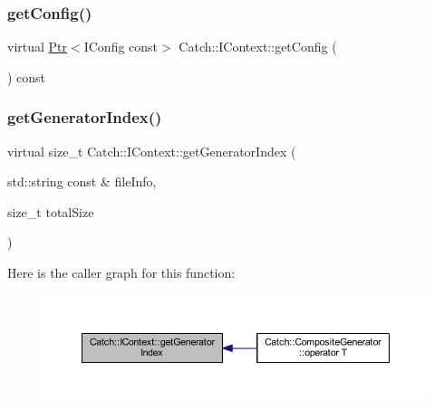 \subsubsection{\texorpdfstring{get\+Config()}{getConfig()}}
{\footnotesize\ttfamily virtual \hyperlink{class_catch_1_1_ptr}{Ptr}$<$I\+Config const$>$ Catch\+::\+I\+Context\+::get\+Config (\begin{DoxyParamCaption}{ }\end{DoxyParamCaption}) const\hspace{0.3cm}{\ttfamily [pure virtual]}}

\hypertarget{struct_catch_1_1_i_context_a43e07088db43299ba129fbe6d3106e95}{}\label{struct_catch_1_1_i_context_a43e07088db43299ba129fbe6d3106e95} 
\subsubsection{\texorpdfstring{get\+Generator\+Index()}{getGeneratorIndex()}}
{\footnotesize\ttfamily virtual size\+\_\+t Catch\+::\+I\+Context\+::get\+Generator\+Index (\begin{DoxyParamCaption}\item[{std\+::string const \&}]{file\+Info,  }\item[{size\+\_\+t}]{total\+Size }\end{DoxyParamCaption})\hspace{0.3cm}{\ttfamily [pure virtual]}}

Here is the caller graph for this function\+:\nopagebreak
\begin{figure}[H]
\begin{center}
\leavevmode
\includegraphics[width=350pt]{struct_catch_1_1_i_context_a43e07088db43299ba129fbe6d3106e95_icgraph}
\end{center}
\end{figure}
\hypertarget{struct_catch_1_1_i_context_a684e4ae71d1fdf3060c352ecde1d122f}{}\label{struct_catch_1_1_i_context_a684e4ae71d1fdf3060c352ecde1d122f} 
